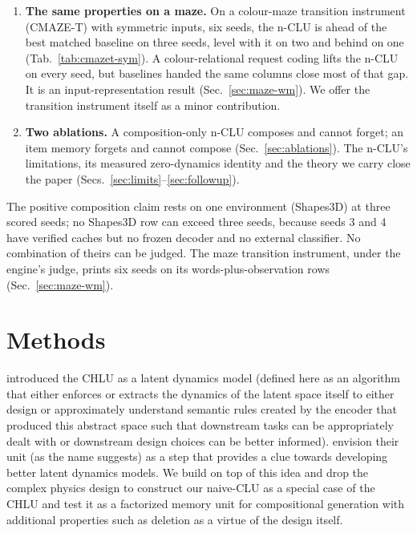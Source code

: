 \documentclass{article} %
\begin{document}
\begin{enumerate}
  separate, structural mechanism, a hole in a coupling table (Sec.~\ref{sec:hole}).
\item \textbf{The same properties on a maze.} On a colour-maze transition instrument (CMAZE-T) with
  symmetric inputs, six seeds, the n-CLU is ahead of
  the best matched baseline on three seeds, level with it on two and behind on one
  (Tab.~\ref{tab:cmazet-sym}). A colour-relational request coding lifts the n-CLU on every seed, but baselines handed the %
  same columns close most of that gap. It is an input-representation result
  (Sec.~\ref{sec:maze-wm}). We offer the transition instrument itself as a minor contribution.
\item \textbf{Two ablations.} A composition-only n-CLU composes and cannot
  forget; an item memory forgets and cannot compose (Sec.~\ref{sec:ablations}). The n-CLU's
  limitations, its measured zero-dynamics identity and the theory we carry close the paper
  (Secs.~\ref{sec:limits}--\ref{sec:followup}).
\end{enumerate}

\noindent The positive composition claim rests
on one environment (Shapes3D) at three scored seeds; no Shapes3D row can exceed three seeds,
because seeds 3 and 4 have verified caches but no frozen decoder and no external classifier. No
combination of theirs can be judged. %
The maze transition instrument, under the engine's judge, prints six seeds on its words-plus-observation rows
(Sec.~\ref{sec:maze-wm}).

\section{Methods}
\label{sec:object}

\citet{jawahar2026chlu} introduced the CHLU as a latent dynamics model (defined here as an algorithm
that either enforces or extracts the dynamics of the latent space itself to either design or
approximately understand semantic rules created by the encoder that produced this abstract space
such that downstream tasks can be appropriately dealt with or downstream design choices can be
better informed). \citet{jawahar2026chlu} envision their unit (as the name suggests) as a step that
provides a clue towards developing better latent dynamics models. We build on top of this idea and
drop the complex physics design to construct our naive-CLU as a special case of the CHLU and test it
as a factorized memory unit for compositional generation with additional properties such as deletion
as a virtue of the design itself.
\end{document}
